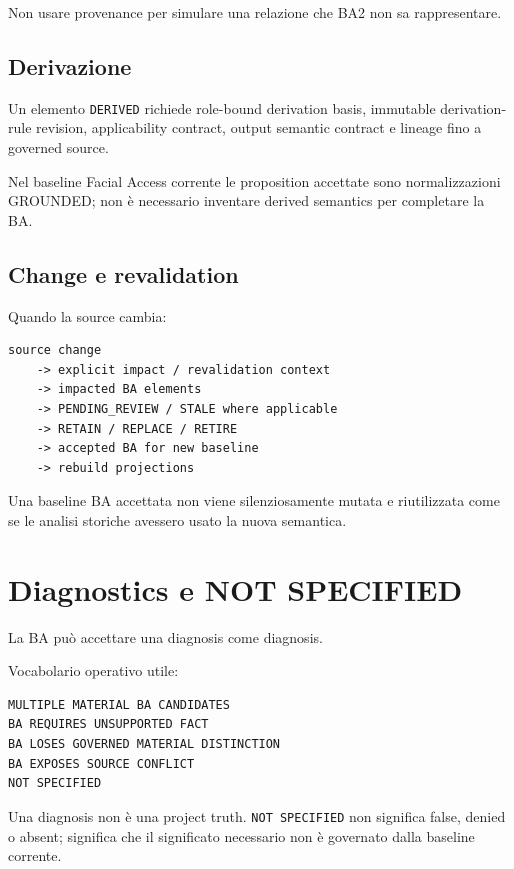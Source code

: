 \documentclass[11pt,a4paper]{article}
\newcommand{\code}[1]{\nolinkurl{#1}}
\begin{document}
Non usare provenance per simulare una relazione che BA2 non sa rappresentare.

\subsection{Derivazione}

Un elemento \code{DERIVED} richiede role-bound derivation basis, immutable derivation-rule revision, applicability contract, output semantic contract e lineage fino a governed source.

Nel baseline Facial Access corrente le proposition accettate sono normalizzazioni GROUNDED; non è necessario inventare derived semantics per completare la BA.

\subsection{Change e revalidation}

Quando la source cambia:

\begin{lstlisting}
source change
    -> explicit impact / revalidation context
    -> impacted BA elements
    -> PENDING_REVIEW / STALE where applicable
    -> RETAIN / REPLACE / RETIRE
    -> accepted BA for new baseline
    -> rebuild projections
\end{lstlisting}

Una baseline BA accettata non viene silenziosamente mutata e riutilizzata come se le analisi storiche avessero usato la nuova semantica.

\section{Diagnostics e NOT SPECIFIED}

La BA può accettare una diagnosis come diagnosis.

Vocabolario operativo utile:

\begin{lstlisting}
MULTIPLE MATERIAL BA CANDIDATES
BA REQUIRES UNSUPPORTED FACT
BA LOSES GOVERNED MATERIAL DISTINCTION
BA EXPOSES SOURCE CONFLICT
NOT SPECIFIED
\end{lstlisting}

\begin{closedbox}
Una diagnosis non è una project truth. \code{NOT SPECIFIED} non significa false, denied o absent; significa che il significato necessario non è governato dalla baseline corrente.
\end{closedbox}
\end{document}
